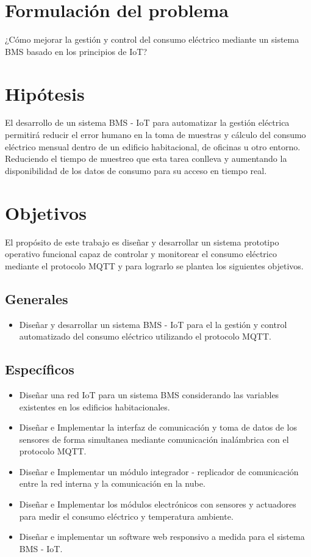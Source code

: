\section{Formulación del problema}

¿Cómo mejorar la gestión y control del consumo eléctrico mediante un sistema BMS basado en los principios de IoT?

\section{Hipótesis}

El desarrollo de un sistema BMS - IoT para automatizar la gestión eléctrica permitirá reducir el error humano en la toma de muestras y cálculo del consumo eléctrico mensual dentro de un edificio habitacional, de oficinas u otro entorno. Reduciendo el tiempo de muestreo que esta tarea conlleva y aumentando la disponibilidad de los datos de consumo para su acceso en tiempo real.

\section{Objetivos}

El propósito de este trabajo es diseñar y desarrollar un sistema prototipo operativo funcional capaz de controlar y monitorear el consumo eléctrico mediante el protocolo MQTT y para lograrlo se plantea los siguientes objetivos.

\subsection{Generales}
\begin{itemize}
\item Diseñar y desarrollar un sistema BMS - IoT para el la gestión y control 
automatizado del consumo eléctrico utilizando el protocolo MQTT.
\end{itemize}
\subsection{Específicos}

\begin{itemize}
\item Diseñar una red IoT para un sistema BMS considerando las variables existentes en los edificios habitacionales.
\item Diseñar e Implementar la interfaz de comunicación y toma de datos de los sensores de forma simultanea mediante comunicación inalámbrica con el protocolo MQTT.
\item Diseñar e Implementar un módulo integrador - replicador de comunicación entre la red interna y la comunicación en la nube.
\item Diseñar e Implementar los módulos electrónicos con sensores y actuadores para medir el consumo eléctrico y temperatura ambiente.
\item Diseñar e implementar un software web responsivo a medida para el sistema BMS - IoT.
\end{itemize}

